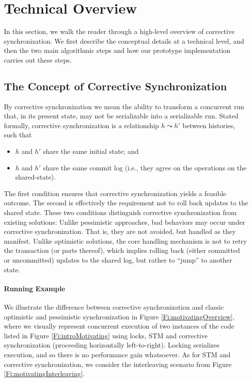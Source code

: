 \section{Technical Overview}

In this section, we walk the reader through a high-level overview of corrective synchronization. We first describe the conceptual details at a technical level, and then the two main algorithmic steps and how our prototype implementation carries out these steps.

\subsection{The Concept of Corrective Synchronization}

By corrective synchronization we mean the ability to transform a concurrent run that, in its present state, may not be serializable into a serializable run. Stated formally, corrective synchronization is a relationship $h \leadsto h'$ between histories, such that
\begin{itemize}
	\item $h$ and $h'$ share the same initial state; and
	\item $h$ and $h'$ share the same commit log (i.e., they agree on the operations on the shared-state).
\end{itemize} 

The first condition ensures that corrective synchronization yields a feasible outcome. The second is effectively the requirement not to roll back updates to the shared state. These two conditions distinguish corrective synchronization from existing solutions: Unlike pessimistic approaches, bad behaviors may occur under corrective synchronization. That is, they are not avoided, but handled as they manifest. Unlike optimistic solutions, the core handling mechanism is not to retry the transaction (or parts thereof), which implies rolling back (either committed or uncommitted) updates to the shared log, but rather to ``jump'' to another state.

\paragraph{Running Example}
We illustrate the difference between corrective synchronization and classic optimistic and pessimistic synchronization in Figure \ref{Fi:motivatingOverview}, where we visually represent concurrent execution of two instances of the code listed in Figure \ref{Fi:introMotivating} using locks, STM and corrective synchronization (proceeding horizontally left-to-right). Locking serializes execution, and so there is no performance gain whatsoever. As for STM and corrective synchronization, we consider the interleaving scenario from Figure \ref{Fi:motivatingInterleaving}. 

